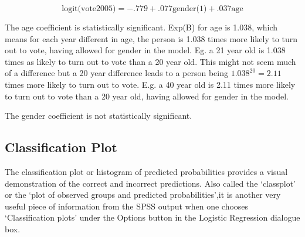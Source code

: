 \documentclass[a4paper,12pt]{article}
\begin{document}

\[\mbox{logit(vote2005)} = -.779 + .077\mbox{gender(1)}+.037\mbox{age}\]

The age coefficient is statistically significant. Exp(B) for age is 1.038, which
means for each year different in age, the person is 1.038 times more likely to turn
out to vote, having allowed for gender in the model. Eg. a 21 year old is 1.038
times as likely to turn out to vote than a 20 year old. This might not seem much
of a difference but a 20 year difference leads to a person being $1.038^20 = 2.11$
times more likely to turn out to vote. E.g. a 40 year old is 2.11 times more likely to
turn out to vote than a 20 year old, having allowed for gender in the model.


The gender coefficient is not statistically significant.

\subsection{Classification Plot} 
The classification plot or histogram of predicted probabilities
provides a visual demonstration of the correct and incorrect predictions. Also called the ‘classplot’ or the ‘plot of observed groups and predicted probabilities’,it is another very useful piece of information from the SPSS output when one chooses
‘Classification plots’ under the Options button in the Logistic Regression dialogue box.
\end{document}
